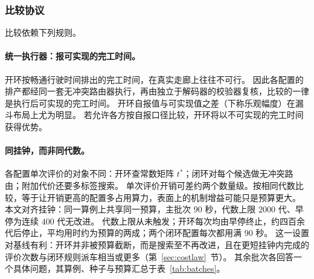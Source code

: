 \documentclass[manuscript,screen,review]{acmart}
\begin{document}
\subsubsection{比较协议}
\label{sec:protocol}

比较依赖下列规则。

\paragraph{统一执行器：报可实现的完工时间。}
开环按畅通行驶时间排出的完工时间，在真实走廊上往往不可行。
因此各配置的排产都经同一套无冲突路由器执行，再由独立于解码器的校验器复核，比较的一律是执行后可实现的完工时间。
开环自报值与可实现值之差（下称乐观幅度）在漏斗布局上尤为明显。
若允许各方按自报口径比较，开环将以不可实现的完工时间获得优势。

\paragraph{同挂钟，而非同代数。}
各配置单次评价的对象不同：开环查常数矩阵 $t^{*}$；闭环对每个候选做无冲突路由；附加代价还要多标签搜索。
单次评价开销可差约两个数量级。按相同代数比较，等于让开销更高的配置多占用算力，表面上的机制增益可能只是预算更大。
本文对齐挂钟：同一算例上共享同一预算，主批次 $90$ 秒，代数上限 $2000$ 代、早停为连续 $400$ 代无改进。
代数上限从未触发；开环每次均由早停终止，约四百余代后停止，平均用时约为预算的两成；两个闭环配置每次都用满 $90$ 秒。
这一设置对基线有利：开环并非被预算截断，而是搜索至不再改进，且在更短挂钟内完成的评价次数与闭环规则派车相当或更多（第~\ref{sec:costlaw}~节）。
其余批次各回答一个具体问题，其算例、种子与预算汇总于表~\ref{tab:batches}。
\end{document}
